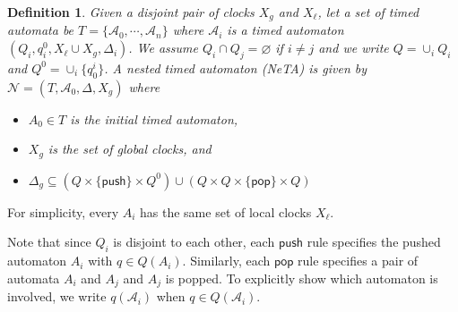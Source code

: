\documentclass{llncs}
\newtheorem{Def}{Definition}
\newcommand{\pushact}{\mathsf{push}}
\newcommand{\popact}{\mathsf{pop}}
\begin{document}
\begin{Def}
  Given a disjoint pair of clocks $X_g$ and $X_\ell$, let a set of timed automata
  be $T=\{\mathcal{A}_0,\cdots,\mathcal{A}_n\}$ where $\mathcal{A}_i$ is a timed
  automaton $(Q_i,q^0_i,X_\ell\cup X_g,\Delta_i)$.  We assume $Q_i\cap Q_j=\varnothing$ if $i\not=j$
  and we write $Q=\cup_i Q_i$ and $Q^0=\cup_{i}\{q^i_0\}$.
  A {\em nested timed automaton} (NeTA) is given by $\mathcal{N}=(T,\mathcal{A}_0,\Delta,X_g)$ where
  \begin{itemize}
    \item $A_0\in T$ is the initial timed automaton,
    \item $X_g$ is the set of global clocks, and
    \item $\Delta_g\subseteq (Q\times\{\pushact\}\times Q^0)\cup(Q\times Q\times\{\popact\}\times Q)$
  \end{itemize}
\end{Def}

For simplicity, every $A_i$ has the same set of local clocks $X_\ell$. 

Note that since $Q_i$ is disjoint to each other, each $\pushact$ rule specifies
the pushed automaton $A_i$ with $q\in Q(A_i)$.  Similarly, each $\popact$ rule specifies
a pair of automata $A_i$ and $A_j$ and $A_j$ is popped.  To explicitly show which
automaton is involved, we write $q(\mathcal{A}_i)$ when $q\in Q(\mathcal{A}_i)$. 

\end{document}
